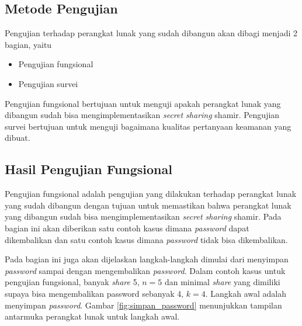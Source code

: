 \subsection{Metode Pengujian}

Pengujian terhadap perangkat lunak yang sudah dibangun akan dibagi menjadi 2 bagian, yaitu
\begin{itemize}
	\item Pengujian fungsional
	\item Pengujian survei
\end{itemize}
Pengujian fungsional bertujuan untuk menguji apakah perangkat lunak yang dibangun sudah bisa mengimplementasikan \textit{secret sharing} shamir. Pengujian survei bertujuan untuk menguji bagaimana kualitas pertanyaan keamanan yang dibuat.

\subsection{Hasil Pengujian Fungsional}\label{subsec:hasil_pengujian_fungsional}

Pengujian fungsional adalah pengujian yang dilakukan terhadap perangkat lunak yang sudah dibangun dengan tujuan untuk memastikan bahwa perangkat lunak yang dibangun sudah bisa mengimplementasikan \textit{secret sharing} shamir. Pada bagian ini akan diberikan satu contoh kasus dimana \textit{password} dapat dikembalikan dan satu contoh kasus dimana \textit{password} tidak bisa dikembalikan.

Pada bagian ini juga akan dijelaskan langkah-langkah dimulai dari menyimpan \textit{password} sampai dengan mengembalikan \textit{password}. Dalam contoh kasus untuk pengujian fungsional, banyak \textit{share} 5, \begin{math}n=5\end{math} dan minimal \textit{share} yang dimiliki supaya bisa mengembalikan password sebanyak 4, \begin{math}k=4\end{math}. Langkah awal adalah menyimpan \textit{password}. Gambar \ref{fig:simpan_password} menunjukkan tampilan antarmuka perangkat lunak untuk langkah awal.

